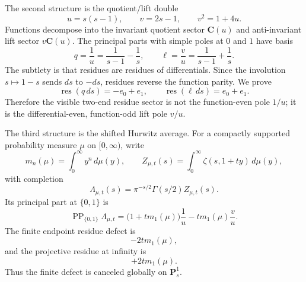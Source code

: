 \documentclass[11pt]{article}
\newcommand{\C}{\mathbf C}
\newcommand{\PP}{\operatorname{PP}}
\newcommand{\res}{\operatorname{res}}
\newcommand{\ellp}{\ell}
\newcommand{\1}{\mathbf 1}
\numberwithin{equation}{section}
\begin{document}
The second structure is the quotient/lift double
\begin{equation}\label{eq:uv-intro}
  u=s(s-1),\qquad v=2s-1,
  \qquad v^2=1+4u.
\end{equation}
Functions decompose into the invariant quotient sector $\C(u)$ and anti-invariant lift sector $v\C(u)$.  The principal parts with simple poles at $0$ and $1$ have basis
\begin{equation}\label{eq:qell-intro}
  q=\frac1u=\frac1{s-1}-\frac1s,
  \qquad
  \ellp=\frac vu=\frac1{s-1}+\frac1s.
\end{equation}
The subtlety is that residues are residues of differentials.  Since the involution $s\mapsto 1-s$ sends $ds$ to $-ds$, residues reverse the function parity.  We prove
\begin{equation}
  \res(q\,ds)=-e_0+e_1,
  \qquad
  \res(\ellp\,ds)=e_0+e_1.
\end{equation}
Therefore the visible two-end residue sector is not the function-even pole $1/u$; it is the differential-even, function-odd lift pole $v/u$.

The third structure is the shifted Hurwitz average.  For a compactly supported probability measure $\mu$ on $[0,\infty)$, write
\begin{equation}
  m_n(\mu)=\int_0^\infty y^n\,d\mu(y),
  \qquad
  Z_{\mu,t}(s)=\int_0^\infty \zeta(s,1+ty)\,d\mu(y),
\end{equation}
with completion
\begin{equation}
  \Lambda_{\mu,t}(s)=\pi^{-s/2}\Gamma(s/2)Z_{\mu,t}(s).
\end{equation}
Its principal part at $\{0,1\}$ is
\begin{equation}\label{eq:main-pp-intro}
  \PP_{\{0,1\}}\Lambda_{\mu,t}
  =\bigl(1+t m_1(\mu)\bigr)\frac1u
  -t m_1(\mu)\frac vu.
\end{equation}
The finite endpoint residue defect is
\begin{equation}
  -2t m_1(\mu),
\end{equation}
and the projective residue at infinity is
\begin{equation}
  +2t m_1(\mu).
\end{equation}
Thus the finite defect is canceled globally on $\mathbf P^1_s$.
\end{document}

